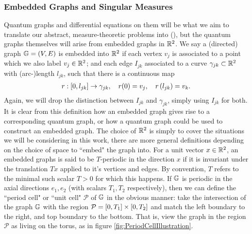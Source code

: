 \subsubsection{Embedded Graphs and Singular Measures} \label{sssec:EmbeddedGraphs}
Quantum graphs and differential equations on them will be what we aim to translate our abstract, measure-theoretic problems into (), but the quantum graphs themselves will arise from embedded graphs in $\mathbb{R}^2$.
We say a (directed) graph $\mathbb{G} = \left( V,E \right)$ is embedded into $\mathbb{R}^2$ if each vertex $v_j$ is associated to a point which we also label $v_j\in\mathbb{R}^2$; and each edge $I_{jk}$ associated to a curve $\gamma_{jk}\subset\mathbb{R}^2$ with (arc-)length $l_{jk}$, such that there is a continuous map
\begin{align*}
	r: \left[ 0,l_{jk} \right] \rightarrow \gamma_{jk}, \quad r(0) = v_j, \quad r\left( l_{jk} \right) = v_k.
\end{align*}
Again, we will drop the distinction between $I_{jk}$ and $\gamma_{jk}$, simply using $I_{jk}$ for both.
It is clear from this definition how an embedded graph gives rise to a corresponding quantum graph, or how a quantum graph could be used to construct an embedded graph.
The choice of $\mathbb{R}^2$ is simply to cover the situations we will be considering in this work, there are more general definitions depending on the choice of space to ``embed" the graph into.
For a unit vector $x\in\mathbb{R}^2$, an embedded graphs is said to be $T$-periodic in the direction $x$ if it is invariant under the translation $Tx$ applied to it's vertices and edges.
By convention, $T$ refers to the minimal such scalar $T>0$ for which this happens.
If $\mathbb{G}$ is periodic in the axial directions $e_1, e_2$ (with scalars $T_1, T_2$ respectively), then we can define the ``period cell" or ``unit cell" $\mathcal{P}$ of $\mathbb{G}$ in the obvious manner: take the intersection of the graph $\mathbb{G}$ with the region $\mathcal{P} = \left[ 0,T_1 \right]\times\left[ 0,T_2 \right]$ and match the left boundary to the right, and top boundary to the bottom.
That is, view the graph in the region $\mathcal{P}$ as living on the torus, as in figure \ref{fig:PeriodCellIllustration}.

